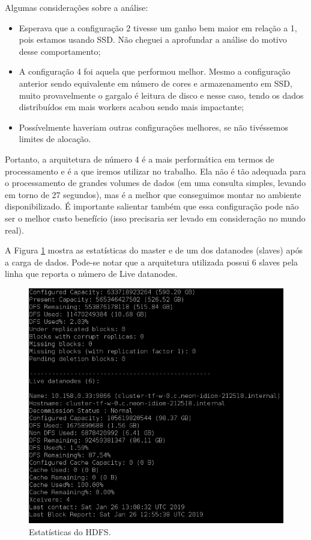 \documentclass{article}
\begin{document}
Algumas considerações sobre a análise:

\begin{itemize}
    \item Esperava que a configuração 2 tivesse um ganho bem maior em relação a 1, pois estamos usando SSD. Não cheguei a aprofundar a análise do motivo desse comportamento;
    \item A configuração 4 foi aquela que performou melhor. Mesmo a configuração anterior sendo equivalente em número de cores e armazenamento em SSD, muito provavelmente o gargalo é leitura de disco e nesse caso, tendo os dados distribuídos em mais workers acabou sendo mais impactante;
    \item Possívelmente haveriam outras configurações melhores, se não tivéssemos limites de alocação.
\end{itemize}

Portanto, a arquitetura de número 4 é a mais performática em termos de processamento e é a que iremos utilizar no trabalho. Ela não é tão adequada para o processamento de grandes volumes de dados (em uma consulta simples, levando em torno de 27 segundos), mas é a melhor que conseguimos montar no ambiente disponibilizado. É importante salientar também que essa configuração pode não ser o melhor custo benefício (isso precisaria ser levado em consideração no mundo real).

A Figura \ref{fig:hdfs_data} mostra as estatísticas do master e de um dos datanodes (slaves) após a carga de dados. Pode-se notar que a arquitetura utilizada possui 6 slaves pela linha que reporta o número de Live datanodes.

\begin{figure}[H]
\centering
  \includegraphics[width=0.6 \linewidth]{img/hdfs-occupation.png}
  \caption{Estatísticas do HDFS.}
  \label{fig:hdfs_data}
\end{figure}
\end{document}
